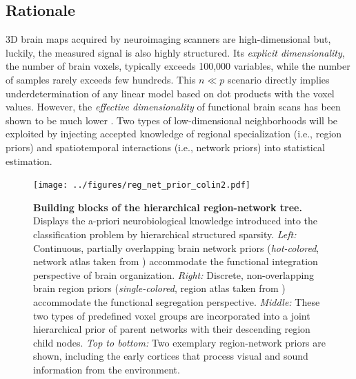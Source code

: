\documentclass[runningheads,a4paper]{llncs}
\begin{document}
\subsection{Rationale}
3D brain maps acquired by neuroimaging
scanners are high-dimensional but, luckily,
the measured signal is also highly structured.
Its \textit{explicit dimensionality}, the number of brain voxels,
typically exceeds 100,000 variables, while the number
of samples rarely exceeds few hundreds.
This $n \ll p$ scenario directly implies underdetermination of any
linear model based on dot products with the voxel values.
However, the \textit{effective dimensionality} of functional brain scans has been
shown to be much lower \cite{bzdok2015semi}.
Two types of low-dimensional neighborhoods will be exploited by
injecting accepted knowledge of regional specialization
(i.e., region priors)
and spatiotemporal interactions
(i.e., network priors)
into statistical estimation.
\begin{figure}
  \vspace{-0.6cm}
  \centering
  \texttt{[image: ../figures/reg\_net\_prior\_colin2.pdf]}
  \vspace{-0.3cm}
  \caption{\textbf{Building blocks of the hierarchical region-network tree.}
  Displays the a-priori neurobiological knowledge
  introduced into the classification problem 
  by hierarchical structured sparsity.
  \textit{Left:} Continuous, partially overlapping brain network priors
  (\textit{hot-colored}, network atlas taken from \cite{smith2009})
  accommodate the functional integration
  perspective of brain organization.
  \textit{Right:} Discrete, non-overlapping brain region priors
  (\textit{single-colored}, region atlas taken from \cite{crad12})
  accommodate the functional segregation perspective.
  \textit{Middle:} These two types of predefined voxel groups are incorporated
  into a joint hierarchical prior of parent networks with their
  descending region child nodes.
  \textit{Top to bottom:} Two exemplary region-network priors
  are shown, including
  the early cortices that process
  visual and sound information from the environment.
  }
  \vspace{-0.6cm}
  \label{fig_priors}
\end{figure}
\end{document}
